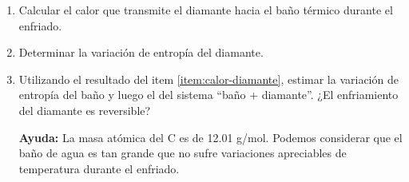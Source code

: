 \documentclass[a4paper,11pt]{article}
\begin{document}
\begin{enumerate}[label=(\alph*),
                  leftmargin=2\parindent,
                  rightmargin=2\parindent]

    \item{\label{item:calor-diamante}
          Calcular el calor que transmite el diamante hacia el baño
          térmico durante el enfriado.}

    \item{Determinar la variación de entropía del diamante.}

    \item{Utilizando el resultado del item \ref{item:calor-diamante},
          estimar la variación de entropía del baño y luego el del sistema
          ``baño + diamante''. ¿El enfriamiento del diamante es
          reversible?
          }

    {\small
    \textbf{Ayuda:}
    La masa atómica del C es de 12.01 g/mol.
    Podemos considerar que el baño de agua es tan grande que no sufre
    variaciones apreciables de temperatura durante el enfriado.
    }

\end{enumerate}
\end{document}
